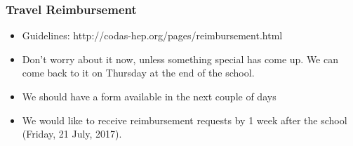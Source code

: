\begin{frame}
\frametitle{Travel Reimbursement}

\begin{itemize}
\item Guidelines: http://codas-hep.org/pages/reimbursement.html
\item Don't worry about it now, unless something special has come up. We can come back to it on Thursday at the end of the school.
\item We should have a form available in the next couple of days
\item We would like to receive reimbursement requests by 1 week after the school (Friday, 21 July, 2017).
\end{itemize}

\end{frame}


